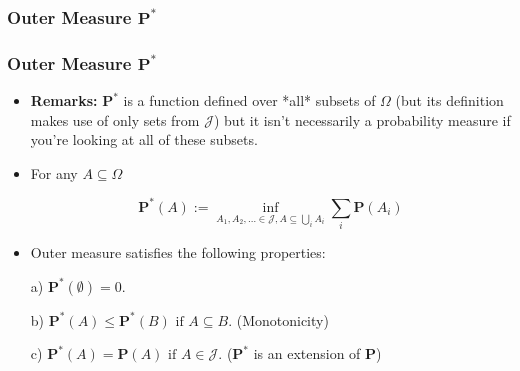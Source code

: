 \documentclass[%
]{beamer}
\newcommand{\BP}{\mathbf{P}}
\begin{document}
\subsubsection{Outer Measure $\BP^*$}
\frame
{
  \frametitle{Outer Measure $\BP^*$}

   \begin{itemize}

      
       \item<1-> \textbf{Remarks:} $\BP^*$ is a function defined over *all* subsets of $\Omega$ (but its definition makes use of only sets from $\mathcal{J}$) but it isn't necessarily a probability measure if you're looking at all of these subsets. 
       
       
		\item<2-> For any $A\subseteq \Omega$
       
       $$\BP^*(A):=\inf_{A_1,A_2,\ldots \in \mathcal{J}, A\subseteq \bigcup_i A_i} \sum_i \BP(A_i) $$
       
        \item<3->   [] \begin{Lemma} Outer measure satisfies the following properties:  
       
       a) $\BP^*(\emptyset)=0.$
       
       b) $\BP^*(A)\leq \BP^*(B)\text{ if } A\subseteq B.$ (Monotonicity)

       c) $\BP^*(A)= \BP(A)\text{ if } A\in \mathcal{J}.$ ($\BP^*$ is an extension of $\BP$)
        \end{Lemma}    
    
                 \end{itemize}
}
\end{document}
